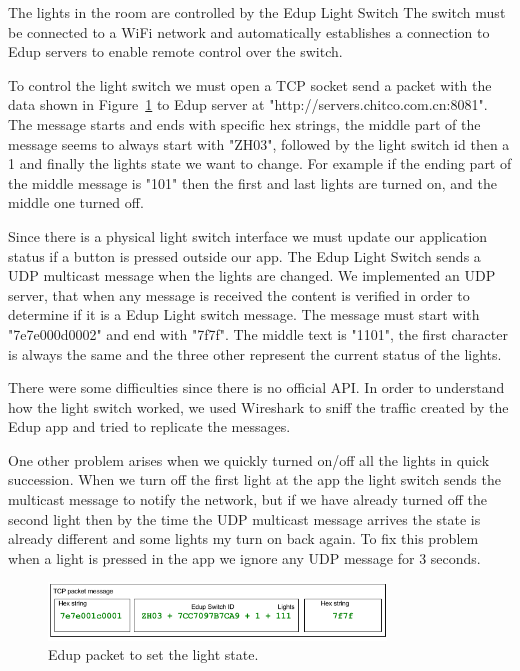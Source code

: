 The lights in the room are controlled by the Edup Light Switch The switch must be connected to a WiFi network and automatically establishes a connection to Edup servers to enable remote control over the switch.

To control the light switch we must open a \ac{TCP} socket send a packet with the data shown in Figure~\ref{edup_imp} to Edup server at "http://servers.chitco.com.cn:8081".
The message starts and ends with specific hex strings, the middle part of the message seems to always start with "ZH03", followed by the light switch id then a 1 and finally the lights state we want to change. For example if the ending part of the middle message is "101" then the first and last lights are turned on, and the middle one turned off.

Since there is a physical light switch interface we must update our application status if a button is pressed outside our app.
The Edup Light Switch sends a \ac{UDP} multicast message when the lights are changed. We implemented an \ac{UDP} server, that when any message is received the content is verified in order to determine if it is a Edup Light switch message. The message must start with "7e7e000d0002" and end with "7f7f". The middle text is "1101", the first character is always the same and the three other represent the current status of the lights. 


There were some difficulties since there is no official API. In order to understand how the light switch worked, we used Wireshark to sniff the traffic created by the Edup app and tried to replicate the messages.

One other problem arises when we quickly turned on/off all the lights in quick succession. When we turn off the first light at the app the light switch sends the multicast message to notify the network, but if we have already turned off the second light then by the time the \ac{UDP} multicast message arrives the state is already different and some lights my turn on back again. To fix this problem when a light is pressed in the app we ignore any \ac{UDP} message for 3 seconds.


\begin{figure}[h]
\centering
\includegraphics[width=0.8\textwidth]{Figures/Edup_imp}
\caption{Edup packet to set the light state.}
\label{edup_imp}
\end{figure}




